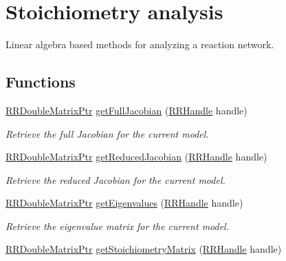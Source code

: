 \hypertarget{group___stoich}{\section{Stoichiometry analysis}
\label{group___stoich}
}


Linear algebra based methods for analyzing a reaction network.  


\subsection*{Functions}
\begin{DoxyCompactItemize}
\item 
\hyperlink{rrc__types_8h_ae586a879d30f0823087e42d93464b5dd}{R\-R\-Double\-Matrix\-Ptr} \hyperlink{group___stoich_ga88846978224863c431128cbd438c8e85}{get\-Full\-Jacobian} (\hyperlink{rrc__types_8h_a1d68f0592372208fa5a5f2799ea4b3ae}{R\-R\-Handle} handle)
\begin{DoxyCompactList}\small\item\em Retrieve the full Jacobian for the current model. \end{DoxyCompactList}\item 
\hyperlink{rrc__types_8h_ae586a879d30f0823087e42d93464b5dd}{R\-R\-Double\-Matrix\-Ptr} \hyperlink{group___stoich_ga1de0e1a27f15a1226b2a1bf1ce55fa7d}{get\-Reduced\-Jacobian} (\hyperlink{rrc__types_8h_a1d68f0592372208fa5a5f2799ea4b3ae}{R\-R\-Handle} handle)
\begin{DoxyCompactList}\small\item\em Retrieve the reduced Jacobian for the current model. \end{DoxyCompactList}\item 
\hyperlink{rrc__types_8h_ae586a879d30f0823087e42d93464b5dd}{R\-R\-Double\-Matrix\-Ptr} \hyperlink{group___stoich_gab8a67356f527fdc041058480189c7f68}{get\-Eigenvalues} (\hyperlink{rrc__types_8h_a1d68f0592372208fa5a5f2799ea4b3ae}{R\-R\-Handle} handle)
\begin{DoxyCompactList}\small\item\em Retrieve the eigenvalue matrix for the current model. \end{DoxyCompactList}\item 
\hyperlink{rrc__types_8h_ae586a879d30f0823087e42d93464b5dd}{R\-R\-Double\-Matrix\-Ptr} \hyperlink{group___stoich_ga9dfb0e092b1bf08be1be27e06faf6f63}{get\-Stoichiometry\-Matrix} (\hyperlink{rrc__types_8h_a1d68f0592372208fa5a5f2799ea4b3ae}{R\-R\-Handle} handle)

\end{DoxyCompactItemize}
